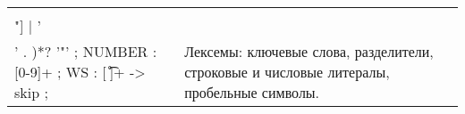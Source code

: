 \begin{longtable}{|p{3in}|p{3in}|}
    \begin{minipage}{3in}
        \begin{verbatim}
PROJECT     : 'project';
SOURCES     : 'sources';
STREAMING   : 'streaming';
STORAGE     : 'storage';
BI          : 'bi';
KAFKA       : 'kafka';
CONNECT     : 'connect';
CLICKHOUSE  : 'clickhouse';
SUPERSET    : 'superset';
NAME        : 'name';
VERSION     : 'version';
DESCRIPTION : 'description';
TYPE        : 'type';
PORT        : 'port';
USERNAME    : 'username';
PASSWORD    : 'password';
ACCESS_KEY  : 'access_key';
SECRET_KEY  : 'secret_key';
REGION      : 'region';
BUCKET      : 'bucket';
NUM_BROKERS : 'num_brokers';
POSTGRES    : 'postgres';
S3          : 's3';
COLON       : ':';
DASH        : '-';
STRING      : 
'"' ( ~[\\"] | '\\' . )*? '"' ;
NUMBER      : [0-9]+ ;
WS          : 
[ \t\r\n]+ -> skip ;
    \end{verbatim}
    \end{minipage}
                                 &
    \begin{minipage}{2.6in}
        Лексемы: ключевые слова, разделители, строковые и числовые литералы, пробельные символы.                                                                                     \end{minipage} \\ \hline
\end{longtable}

	
	
	
